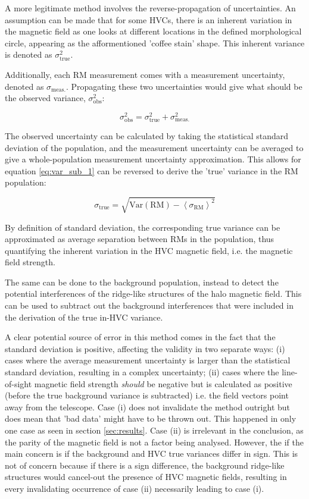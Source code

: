 A more legitimate method involves the reverse-propagation of uncertainties. An assumption can be made that for some HVCs, there is an inherent variation in the magnetic field as one looks at different locations in the defined morphological circle, appearing as the afformentioned 'coffee stain' shape. This inherent variance is denoted as $\sigma_{\mathrm{true}}^2$.


Additionally, each RM measurement comes with a measurement uncertainty, denoted as $\sigma_{\mathrm{meas.}}$. Propagating these two uncertainties would give what should be the observed variance, $\sigma_{\mathrm{obs}}^2$:


\begin{equation}
    \sigma_{\mathrm{obs}}^2 = \sigma_{\mathrm{true}}^2 + \sigma_{\mathrm{meas.}}^2
\label{eq:var_sub_1}
\end{equation}


The observed uncertainty can be calculated by taking the statistical standard deviation of the population, and the measurement uncertainty can be averaged to give a whole-population measurement uncertainty approximation. This allows for equation \ref{eq:var_sub_1} can be reversed to derive the 'true' variance in the RM population:


\begin{equation}
    \sigma_{\mathrm{true}} = \sqrt{\mathrm{Var}\left(\mathrm{RM}\right) - {\left<\sigma_{\mathrm{RM}}\right>}^2}
\label{eq:var_sub_2}
\end{equation}


By definition of standard deviation, the corresponding true variance can be approximated as average separation between RMs in the population, thus quantifying the inherent variation in the HVC magnetic field, i.e. the magnetic field strength.


The same can be done to the background population, instead to detect the potential interferences of the ridge-like structures of the halo magnetic field. This can be used to subtract out the background interferences that were included in the derivation of the true in-HVC variance.


A clear potential source of error in this method comes in the fact that the standard deviation is positive, affecting the validity in two separate ways: (i) cases where the average measurement uncertainty is larger than the statistical standard deviation, resulting in a complex uncertainty; (ii) cases where the line-of-sight magnetic field strength \textit{should} be negative but is calculated as positive (before the true background variance is subtracted) i.e. the field vectors point away from the telescope. Case (i) does not invalidate the method outright but does mean that 'bad data' might have to be thrown out. This happened in only one case as seen in section \ref{sec:results}. Case (ii) is irrelevant in the conclusion, as the parity of the magnetic field is not a factor being analysed. However, the if the main concern is if the background and HVC true variances differ in sign. This is not of concern because if there is a sign difference, the background ridge-like structures would cancel-out the presence of HVC magnetic fields, resulting in every invalidating occurrence of case (ii) necessarily leading to case (i).


